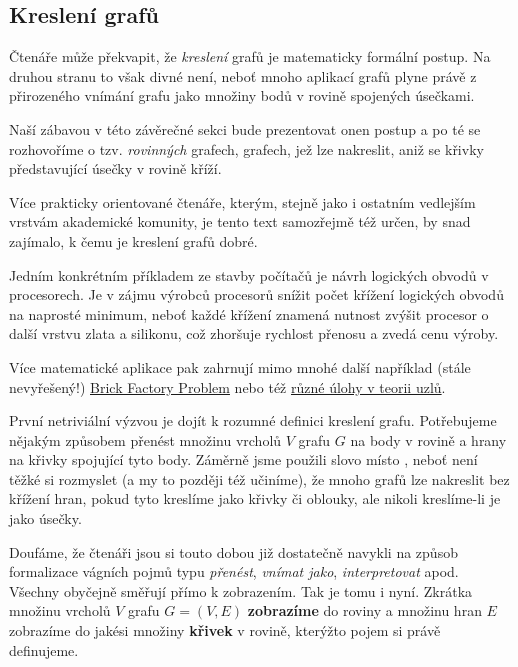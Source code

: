 \subsection{Kreslení grafů}
\label{ssec:kresleni-grafu}

Čtenáře může překvapit, že \emph{kreslení} grafů je matematicky formální postup.
Na druhou stranu to však divné není, neboť mnoho aplikací grafů plyne právě z
přirozeného vnímání grafu jako množiny bodů v rovině spojených úsečkami.

Naší zábavou v této závěrečné sekci bude prezentovat onen postup a po té se
rozhovoříme o tzv. \emph{rovinných} grafech, grafech, jež lze nakreslit, aniž se
křivky představující úsečky v rovině kříží.

Více prakticky orientované čtenáře, kterým, stejně jako i ostatním vedlejším
vrstvám akademické komunity, je tento text samozřejmě též určen, by snad
zajímalo, k čemu je kreslení grafů dobré.

Jedním konkrétním příkladem ze stavby počítačů je návrh logických obvodů v
procesorech. Je v zájmu výrobců procesorů snížit počet křížení logických obvodů
na naprosté minimum, neboť každé křížení znamená nutnost zvýšit procesor o další
vrstvu zlata a silikonu, což zhoršuje rychlost přenosu a zvedá cenu výroby.

Více matematické aplikace pak zahrnují mimo mnohé další například (stá\-le
nevyřešený!)
\href{https://en.wikipedia.org/wiki/Tur%C3%A1n%27s_brick_factory_problem}{Brick
Factory Problem} nebo též
\href{https://www.sciencedirect.com/science/article/abs/pii/S0252960212600472}{různé
úlohy v teorii uzlů}.

První netriviální výzvou je dojít k rozumné definici kreslení grafu. Potřebujeme
nějakým způsobem přenést množinu vrcholů $V$ grafu $G$ na body v rovině a hrany
na křivky spojující tyto body. Záměrně jsme použili slovo  místo
, neboť není těžké si rozmyslet (a my to později též učiníme), že
mnoho grafů lze nakreslit bez křížení hran, pokud tyto kreslíme jako křivky či
oblouky, ale nikoli kreslíme-li je jako úsečky.

Doufáme, že čtenáři jsou si touto dobou již dostatečně navykli na způsob
formalizace vágních pojmů typu \emph{přenést}, \emph{vnímat jako},
\emph{interpretovat} apod. Všechny obyčejně směřují přímo k zobrazením. Tak je
tomu i nyní. Zkrátka množinu vrcholů $V$ grafu $G = (V,E)$ \textbf{zobrazíme} do
roviny a množinu hran $E$ zobrazíme do jakési množiny \textbf{křivek} v rovině,
kterýžto pojem si právě definujeme.

